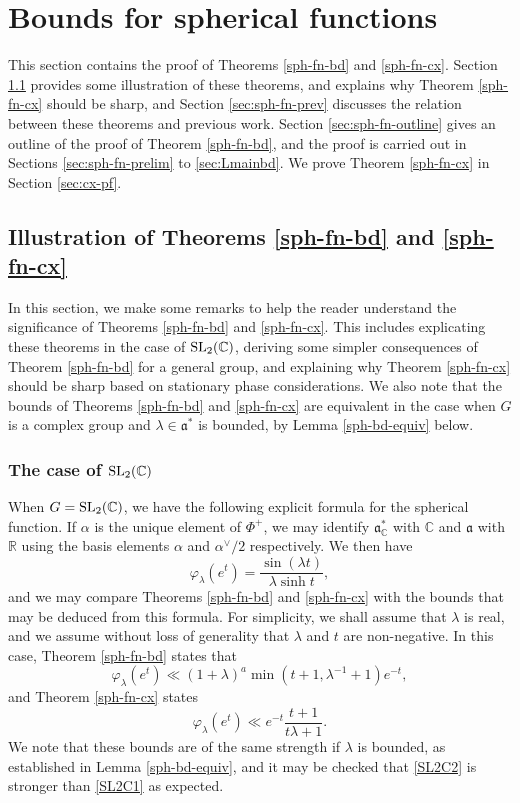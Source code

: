 \documentclass[12pt]{amsart}
\theoremstyle{remark}
\newcommand{\R}{\mathbb R}
\newcommand{\C}{\mathbb C}
\newcommand{\ga}{\mathfrak a}
\newcommand{\be}{\begin{equation}}
\newcommand{\ee}{\end{equation}}
\begin{document}
\section{Bounds for spherical functions}
\label{sec:sph-fn}

This section contains the proof of Theorems \ref{sph-fn-bd} and \ref{sph-fn-cx}.  Section \ref{sec:sph-fn-conseq} provides some illustration of these theorems, and explains why Theorem \ref{sph-fn-cx} should be sharp, and Section \ref{sec:sph-fn-prev} discusses the relation between these theorems and previous work.  Section \ref{sec:sph-fn-outline} gives an outline of the proof of Theorem \ref{sph-fn-bd}, and the proof is carried out in Sections \ref{sec:sph-fn-prelim} to \ref{sec:Lmainbd}.  We prove Theorem \ref{sph-fn-cx} in Section \ref{sec:cx-pf}.

\subsection{Illustration of Theorems \ref{sph-fn-bd} and \ref{sph-fn-cx}}
\label{sec:sph-fn-conseq}

In this section, we make some remarks to help the reader understand the significance of Theorems \ref{sph-fn-bd} and \ref{sph-fn-cx}.  This includes explicating these theorems in the case of ${\rm SL}_2(\C)$, deriving some simpler consequences of Theorem \ref{sph-fn-bd} for a general group, and explaining why Theorem \ref{sph-fn-cx} should be sharp based on stationary phase considerations.  We also note that the bounds of Theorems \ref{sph-fn-bd} and \ref{sph-fn-cx} are equivalent in the case when $G$ is a complex group and $\lambda \in \ga^*$ is bounded, by Lemma \ref{sph-bd-equiv} below.

\subsubsection{The case of ${\rm SL}_2(\C)$}

When $G = {\rm SL}_2(\C)$, we have the following explicit formula for the spherical function.  If $\alpha$ is the unique element of $\Phi^+$, we may identify $\ga^*_\C$ with $\C$ and $\ga$ with $\R$ using the basis elements $\alpha$ and $\alpha^\vee/2$ respectively.  We then have
\be
\label{SL2C}
\varphi_\lambda(e^t) = \frac{\sin(\lambda t)}{\lambda \sinh t},
\ee
and we may compare Theorems \ref{sph-fn-bd} and \ref{sph-fn-cx} with the bounds that may be deduced from this formula.  For simplicity, we shall assume that $\lambda$ is real, and we assume without loss of generality that $\lambda$ and $t$ are non-negative.  In this case, Theorem \ref{sph-fn-bd} states that
\be
\label{SL2C1}
\varphi_\lambda(e^t) \ll (1 + \lambda)^a \min( t+1, \lambda^{-1} + 1) e^{-t},
\ee
and Theorem \ref{sph-fn-cx} states
\be
\label{SL2C2}
\varphi_\lambda(e^t) \ll e^{-t} \frac{t+1}{t\lambda +1}.
\ee
We note that these bounds are of the same strength if $\lambda$ is bounded, as established in Lemma \ref{sph-bd-equiv}, and it may be checked that \eqref{SL2C2} is stronger than \eqref{SL2C1} as expected.
\end{document}
